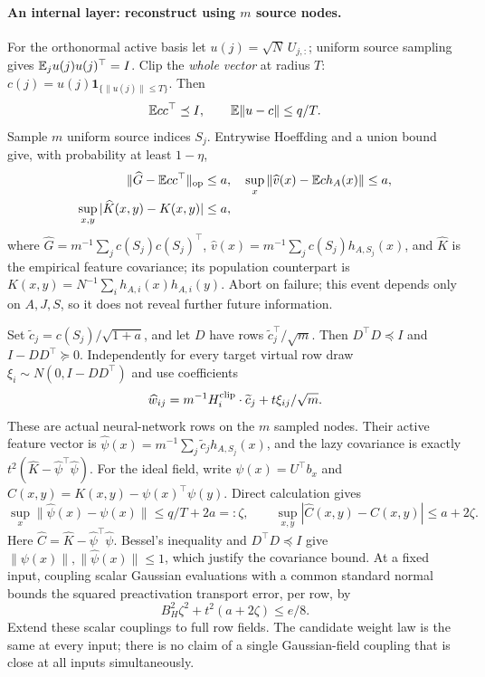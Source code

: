 \paragraph{An internal layer: reconstruct using $m$ source nodes.}
For the orthonormal active basis let $u(j)=\sqrt N\,U_{j,:}$; uniform source
sampling gives $\mathbb E_j u(j)u(j)^\top=I$.
Clip the \emph{whole vector} at radius $T$:
$c(j)=u(j)\mathbf1_{\{\|u(j)\|\le T\}}$. Then
\[
 \mathbb E cc^\top\preceq I,\qquad \mathbb E\|u-c\|\le q/T.
\]
Sample $m$ uniform source indices $S_j$. Entrywise Hoeffding and a union bound
give, with probability at least $1-\eta$,
\begin{align*}
 \|\widehat G-\mathbb E cc^\top\|_{\mathrm{op}}&\le a,\quad
 \sup_x\|\widehat v(x)-\mathbb E c h_A(x)\|\le a,\\
 \sup_{x,y}|\widehat K(x,y)-K(x,y)|&\le a,
\end{align*}
where $\widehat G=m^{-1}\sum_jc(S_j)c(S_j)^\top$,
$\widehat v(x)=m^{-1}\sum_jc(S_j)h_{A,S_j}(x)$, and $\widehat K$ is the
empirical feature covariance; its population counterpart is
$K(x,y)=N^{-1}\sum_i h_{A,i}(x)h_{A,i}(y)$.
Abort on failure; this event depends only on
$A,J,S$, so it does not reveal further future information.

Set $\widetilde c_j=c(S_j)/\sqrt{1+a}$, and let $D$ have rows
$\widetilde c_j^\top/\sqrt m$. Then $D^\top D\preceq I$ and
$I-DD^\top\succeq0$. Independently for every target virtual row draw
$\xi_i\sim N(0,I-DD^\top)$ and use coefficients
\begin{equation}\label{eq:finite-row}
 \widehat w_{ij}=m^{-1}H_i^{\rm clip}\cdot\widetilde c_j
                         +t\xi_{ij}/\sqrt m.
\end{equation}
These are actual neural-network rows on the $m$ sampled nodes.
Their active feature vector is
$\widehat\psi(x)=m^{-1}\sum_j\widetilde c_jh_{A,S_j}(x)$, and the lazy
covariance is exactly $t^2(\widehat K-\widehat\psi^\top\widehat\psi)$.
For the ideal field, write $\psi(x)=U^\top b_x$ and
$C(x,y)=K(x,y)-\psi(x)^\top\psi(y)$. Direct calculation gives
\[
 \sup_x\|\widehat\psi(x)-\psi(x)\|\le q/T+2a=:\zeta,
 \qquad \sup_{x,y}|\widehat C(x,y)-C(x,y)|\le a+2\zeta.
\]
Here $\widehat C=\widehat K-\widehat\psi^\top\widehat\psi$.
Bessel's inequality and $D^\top D\preceq I$ give
$\|\psi(x)\|,\|\widehat\psi(x)\|\le1$, which justify the covariance bound.
At a fixed input, coupling scalar Gaussian evaluations with a common standard
normal bounds the squared preactivation transport error, per row, by
\[
 B_H^2\zeta^2+t^2(a+2\zeta)\le e/8.
\]
Extend these scalar couplings to full row fields. The candidate weight law is
the same at every input; there is no claim of a single Gaussian-field coupling
that is close at all inputs simultaneously.

